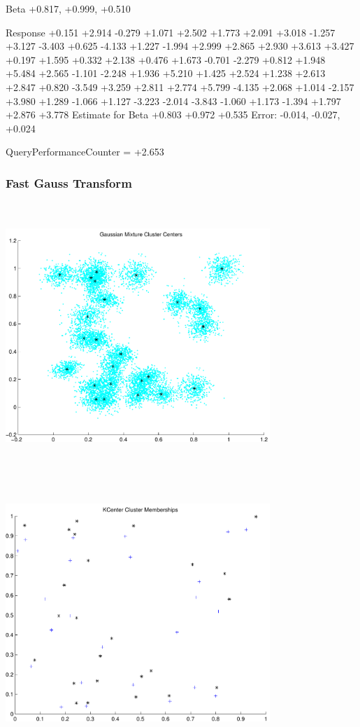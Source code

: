 \documentclass[9pt]{article}
\theoremstyle{plain}
\theoremstyle{definition}
\theoremstyle{remark}
\numberwithin{equation}{section}
\begin{document}
Beta
+0.817, +0.999, +0.510

Response
+0.151
+2.914
-0.279
+1.071
+2.502
+1.773
+2.091
+3.018
-1.257
+3.127
-3.403
+0.625
-4.133
+1.227
-1.994
+2.999
+2.865
+2.930
+3.613
+3.427
+0.197
+1.595
+0.332
+2.138
+0.476
+1.673
-0.701
-2.279
+0.812
+1.948
+5.484
+2.565
-1.101
-2.248
+1.936
+5.210
+1.425
+2.524
+1.238
+2.613
+2.847
+0.820
-3.549
+3.259
+2.811
+2.774
+5.799
-4.135
+2.068
+1.014
-2.157
+3.980
+1.289
-1.066
+1.127
-3.223
-2.014
-3.843
-1.060
+1.173
-1.394
+1.797
+2.876
+3.778
Estimate for Beta
+0.803
+0.972
+0.535
Error:
-0.014, -0.027, +0.024


QueryPerformanceCounter  =  +2.653
\subsubsection{Fast Gauss Transform}
\includegraphics[width=10.0cm,height=10.0cm]{GaussianMixture_ClusterCenters25_Centers.pdf}

\includegraphics[width=10.0cm,height=10.0cm]{KCenterClusterMemberships_25_Centers.pdf}
\end{document}
